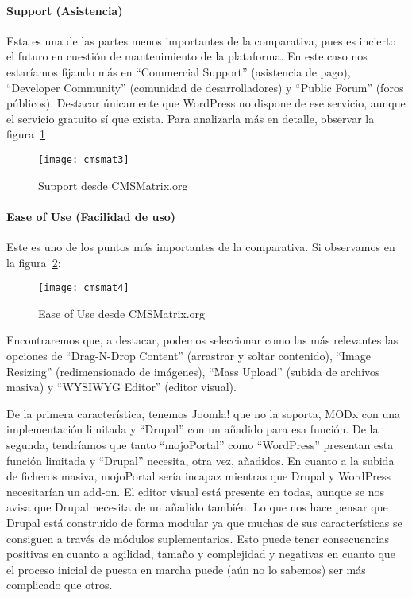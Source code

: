 \paragraph{Support (Asistencia)}

\par Esta es una de las partes menos importantes de la comparativa, pues es incierto el futuro en cuestión de mantenimiento de la plataforma. En este caso nos estaríamos fijando más en ``Commercial Support'' (asistencia de pago), ``Developer Community'' (comunidad de desarrolladores) y ``Public Forum'' (foros públicos). Destacar únicamente que WordPress no dispone de ese servicio, aunque el servicio gratuito sí que exista. Para analizarla más en detalle, observar la figura~\ref{fig:cmsmat3}

\begin{figure}
\begin{narrow}{-0.12\linewidth}{-0.12\linewidth}
\centering
\texttt{[image: cmsmat3]}
\caption{Support desde CMSMatrix.org}
\label{fig:cmsmat3}
\end{narrow}
\end{figure}

\paragraph{Ease of Use (Facilidad de uso)}

\par Este es uno de los puntos más importantes de la comparativa. Si observamos en la figura~\ref{fig:cmsmat4}:

\begin{figure}
\begin{narrow}{-0.12\linewidth}{-0.12\linewidth}
\centering
\texttt{[image: cmsmat4]}
\caption{Ease of Use desde CMSMatrix.org}
\label{fig:cmsmat4}
\end{narrow}
\end{figure}

\par Encontraremos que, a destacar, podemos seleccionar como las más relevantes las opciones de ``Drag-N-Drop Content'' (arrastrar y soltar contenido), ``Image Resizing'' (redimensionado de imágenes), ``Mass Upload'' (subida de archivos masiva) y ``WYSIWYG Editor'' (editor visual).
\par De la primera característica, tenemos Joomla! que no la soporta, MODx con una implementación limitada y ``Drupal'' con un añadido para esa función. De la segunda, tendríamos que tanto ``mojoPortal'' como ``WordPress'' presentan esta función limitada y ``Drupal'' necesita, otra vez, añadidos. En cuanto a la subida de ficheros masiva, mojoPortal sería incapaz mientras que Drupal y WordPress necesitarían un add-on. El editor visual está presente en todas, aunque se nos avisa que Drupal necesita de un añadido también. Lo que nos hace pensar que Drupal está construido de forma modular ya que muchas de sus características se consiguen a través de módulos suplementarios. Esto puede tener consecuencias positivas en cuanto a agilidad, tamaño y complejidad y negativas en cuanto que el proceso inicial de puesta en marcha puede (aún no lo sabemos) ser más complicado que otros.



